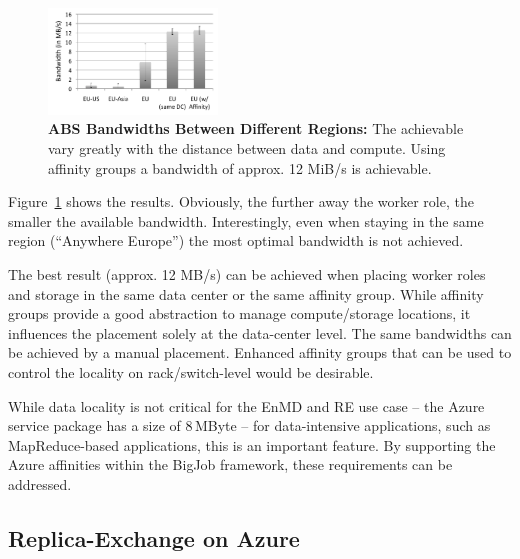 \documentclass[conference,final]{IEEEtran}
\newcommand{\up}{\vspace*{-1em}}
\newcommand{\jhanote}[1]{ {\textcolor{red} { ***SJ: #1 }}}
\newcommand{\jhanote}[1]{}
\begin{document}
\begin{figure}[t]
    \centering
        \includegraphics[width=0.4\textwidth]{performance/azure-data-transfer.pdf}
          \caption{\textbf{ABS Bandwidths Between
            Different Regions:} The achievable vary greatly with the
          distance between data and compute. Using affinity groups a
          bandwidth of approx. 12 MiB/s is achievable.}
    \label{fig:performance_azure-data-transfer}
\end{figure}
Figure~\ref{fig:performance_azure-data-transfer} shows the results.
Obviously, the further away the worker role, the smaller the available
bandwidth. Interestingly, even when staying in the same region
(``Anywhere Europe'') the most optimal bandwidth is not achieved.

The best result (approx. 12 MB/s) %
can be achieved when placing worker roles and storage in the same data
center or the same affinity group. While affinity groups provide a
good abstraction to manage compute/storage locations, it influences
the placement solely at the data-center level. The same bandwidths can
be achieved by a manual placement. Enhanced affinity groups that can
be used to control the locality on rack/switch-level would be
desirable.


While data locality is not critical for the EnMD and RE use case --
the Azure service package has a size of 8\,MByte -- for data-intensive
applications, such as MapReduce-based applications, this is an
important feature. By supporting the Azure affinities within the
BigJob framework, these requirements can be addressed.  \up

\subsection{Replica-Exchange on Azure}
\end{document}
